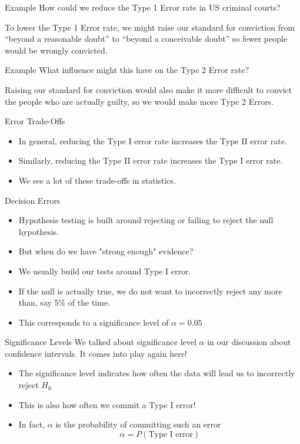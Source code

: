 \begin{frame}{Example}
    How could we reduce the Type 1 Error rate in US criminal courts? 
    
    \vspace{12pt}To lower the Type 1 Error rate, we might raise our standard for conviction from “beyond a reasonable doubt” to “beyond a conceivable doubt” so fewer people would be wrongly convicted. 
\end{frame}

\begin{frame}{Example}
    What influence might this have on the Type 2 Error rate?

    \vspace{12pt}Raising our standard for conviction would also make it more difficult to convict the people who are actually guilty, so we would make more Type 2 Errors.
\end{frame}

\begin{frame}{Error Trade-Offs}
    \begin{itemize}
        \item In general, reducing the Type I error rate increases the Type II error rate.
        \item Similarly, reducing the Type II error rate increases the Type I error rate.
        \item We see a lot of these trade-offs in statistics.
    \end{itemize}
\end{frame}

\begin{frame}{Decision Errors}
    \begin{itemize}
        \item Hypothesis testing is built around rejecting or failing to reject the null hypothesis.
        \item But when do we have "strong enough" evidence?
        \item We usually build our tests around Type I error.
        \item If the null is actually true, we do not want to incorrectly reject any more than, say 5\% of the time.
        \item This corresponds to a significance level of $\alpha=0.05$
    \end{itemize}
\end{frame}

\begin{frame}{Significance Levels}
    We talked about significance level $\alpha$ in our discussion about confidence intervals. It comes into play again here!
    \begin{itemize}
        \item The significance level indicates how often the data will lead us to incorrectly reject $H_0$
        \item This is also how often we commit a Type I error!
        \item In fact, $\alpha$ is the probability of committing such an error
        \[
            \alpha = P(\text{Type I error})
        \]
    \end{itemize}
\end{frame}

